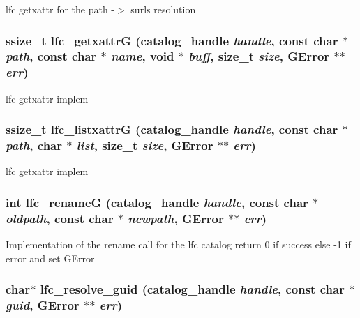 lfc getxattr for the path -$>$ surls resolution 
\subsubsection{\setlength{\rightskip}{0pt plus 5cm}ssize\_\-t lfc\_\-getxattr\-G (catalog\_\-handle {\em handle}, const char $\ast$ {\em path}, const char $\ast$ {\em name}, void $\ast$ {\em buff}, size\_\-t {\em size}, GError $\ast$$\ast$ {\em err})}\label{gfal__common__lfc_8c_b4cd844c617093e2a9d612583fb334f7}


lfc getxattr implem 
\subsubsection{\setlength{\rightskip}{0pt plus 5cm}ssize\_\-t lfc\_\-listxattr\-G (catalog\_\-handle {\em handle}, const char $\ast$ {\em path}, char $\ast$ {\em list}, size\_\-t {\em size}, GError $\ast$$\ast$ {\em err})}\label{gfal__common__lfc_8c_e0af2e851445fcb0339ed760a9a78aff}


lfc getxattr implem 
\subsubsection{\setlength{\rightskip}{0pt plus 5cm}int lfc\_\-rename\-G (catalog\_\-handle {\em handle}, const char $\ast$ {\em oldpath}, const char $\ast$ {\em newpath}, GError $\ast$$\ast$ {\em err})}\label{gfal__common__lfc_8c_cb750f4f936abd772a5f53f5b1fbdaec}


Implementation of the rename call for the lfc catalog return 0 if success else -1 if error and set GError 
\subsubsection{\setlength{\rightskip}{0pt plus 5cm}char$\ast$ lfc\_\-resolve\_\-guid (catalog\_\-handle {\em handle}, const char $\ast$ {\em guid}, GError $\ast$$\ast$ {\em err})}\label{gfal__common__lfc_8c_b8943f8f5fd7211851bf7732d9c3b50b}


